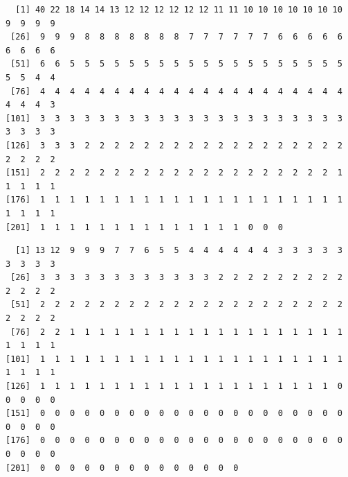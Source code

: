 \documentclass[
  letterpaper,
  DIV=11,
  numbers=noendperiod]{scrartcl}
\newenvironment{Shaded}{\begin{snugshade}}{\end{snugshade}}
\newcommand{\AttributeTok}[1]{\textcolor[rgb]{0.40,0.45,0.13}{#1}}
\newcommand{\ConstantTok}[1]{\textcolor[rgb]{0.56,0.35,0.01}{#1}}
\newcommand{\DecValTok}[1]{\textcolor[rgb]{0.68,0.00,0.00}{#1}}
\newcommand{\FloatTok}[1]{\textcolor[rgb]{0.68,0.00,0.00}{#1}}
\newcommand{\FunctionTok}[1]{\textcolor[rgb]{0.28,0.35,0.67}{#1}}
\newcommand{\NormalTok}[1]{\textcolor[rgb]{0.00,0.23,0.31}{#1}}
\newcommand{\OtherTok}[1]{\textcolor[rgb]{0.00,0.23,0.31}{#1}}
\newcommand{\SpecialCharTok}[1]{\textcolor[rgb]{0.37,0.37,0.37}{#1}}
\begin{document}
\begin{verbatim}
  [1] 40 22 18 14 14 13 12 12 12 12 12 12 11 11 10 10 10 10 10 10 10  9  9  9  9
 [26]  9  9  9  8  8  8  8  8  8  8  7  7  7  7  7  7  6  6  6  6  6  6  6  6  6
 [51]  6  6  5  5  5  5  5  5  5  5  5  5  5  5  5  5  5  5  5  5  5  5  5  4  4
 [76]  4  4  4  4  4  4  4  4  4  4  4  4  4  4  4  4  4  4  4  4  4  4  4  4  3
[101]  3  3  3  3  3  3  3  3  3  3  3  3  3  3  3  3  3  3  3  3  3  3  3  3  3
[126]  3  3  3  2  2  2  2  2  2  2  2  2  2  2  2  2  2  2  2  2  2  2  2  2  2
[151]  2  2  2  2  2  2  2  2  2  2  2  2  2  2  2  2  2  2  2  2  1  1  1  1  1
[176]  1  1  1  1  1  1  1  1  1  1  1  1  1  1  1  1  1  1  1  1  1  1  1  1  1
[201]  1  1  1  1  1  1  1  1  1  1  1  1  1  1  0  0  0
\end{verbatim}

\begin{Shaded}
\end{Shaded}

\begin{verbatim}
  [1] 13 12  9  9  9  7  7  6  5  5  4  4  4  4  4  4  3  3  3  3  3  3  3  3  3
 [26]  3  3  3  3  3  3  3  3  3  3  3  3  2  2  2  2  2  2  2  2  2  2  2  2  2
 [51]  2  2  2  2  2  2  2  2  2  2  2  2  2  2  2  2  2  2  2  2  2  2  2  2  2
 [76]  2  2  1  1  1  1  1  1  1  1  1  1  1  1  1  1  1  1  1  1  1  1  1  1  1
[101]  1  1  1  1  1  1  1  1  1  1  1  1  1  1  1  1  1  1  1  1  1  1  1  1  1
[126]  1  1  1  1  1  1  1  1  1  1  1  1  1  1  1  1  1  1  1  1  0  0  0  0  0
[151]  0  0  0  0  0  0  0  0  0  0  0  0  0  0  0  0  0  0  0  0  0  0  0  0  0
[176]  0  0  0  0  0  0  0  0  0  0  0  0  0  0  0  0  0  0  0  0  0  0  0  0  0
[201]  0  0  0  0  0  0  0  0  0  0  0  0  0  0
\end{verbatim}

\begin{Shaded}
\end{Shaded}
\end{document}
